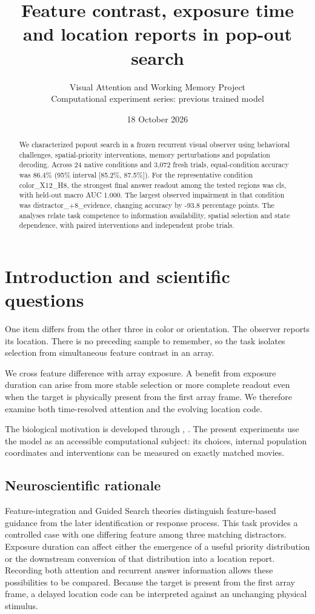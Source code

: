 \documentclass[11pt]{article}
\begin{document}
\title{\color{ink}Feature contrast, exposure time and location reports in pop-out search}
\author{Visual Attention and Working Memory Project\\Computational experiment series: previous trained model}\date{18 October 2026}\maketitle
\begin{abstract}
We characterized popout search in a frozen recurrent visual observer using behavioral challenges, spatial-priority interventions, memory perturbations and population decoding. Across 24 native conditions and 3,072 fresh trials, equal-condition accuracy was 86.4\% (95\% interval [85.2\%, 87.5\%]). For the representative condition color\_\allowbreak{}X12\_\allowbreak{}H8, the strongest final answer readout among the tested regions was cls, with held-out macro AUC 1.000. The largest observed impairment in that condition was distractor\_\allowbreak{}+8\_\allowbreak{}evidence, changing accuracy by -93.8 percentage points. The analyses relate task competence to information availability, spatial selection and state dependence, with paired interventions and independent probe trials.
\end{abstract}
\section{Introduction and scientific questions}
One item differs from the other three in color or orientation. The observer reports its location. There is no preceding sample to remember, so the task isolates selection from simultaneous feature contrast in an array.

We cross feature difference with array exposure. A benefit from exposure duration can arise from more stable selection or more complete readout even when the target is physically present from the first array frame. We therefore examine both time-resolved attention and the evolving location code.

The biological motivation is developed through \cite{treisman}, \cite{wolfe}. The present experiments use the model as an accessible computational subject: its choices, internal population coordinates and interventions can be measured on exactly matched movies.

\subsection{Neuroscientific rationale}
Feature-integration and Guided Search theories distinguish feature-based guidance from the later identification or response process. This task provides a controlled case with one differing feature among three matching distractors. Exposure duration can affect either the emergence of a useful priority distribution or the downstream conversion of that distribution into a location report. Recording both attention and recurrent answer information allows these possibilities to be compared. Because the target is present from the first array frame, a delayed location code can be interpreted against an unchanging physical stimulus.
\end{document}
